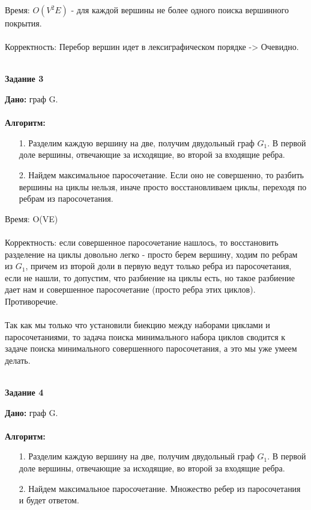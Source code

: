 \documentclass[12pt]{article} %
\begin{document}
	Время: $O(V^2E)$ - для каждой вершины не более одного поиска вершинного покрытия.\\
	\\
	Корректность: Перебор вершин идет в лексиграфическом порядке -> Очевидно.\\
	\\
	\begin{center}
		\textbf{Задание 3}\\
	\end{center}
	\textbf{Дано:} граф G.\\
	\\
	\textbf{Алгоритм:} \\
	\begin{enumerate}
		\item[1.] Разделим каждую вершину на две, получим двудольный граф $G_1$. В первой доле вершины, отвечающие за исходящие, во второй за входящие ребра.
		\item[2.] Найдем максимальное паросочетание. Если оно не совершенно, то разбить вершины на циклы нельзя,
				   иначе просто восстановливаем циклы, переходя по ребрам из паросочетания.
	\end{enumerate}
	Время: O(VE)\\
	\\
	Корректность: если совершенное паросочетание нашлось, то восстановить разделение на циклы довольно легко - просто 
				  берем вершину, ходим по ребрам из $G_1$, причем из второй доли в первую ведут только ребра из паросочетания, если не нашли, то допустим, что разбиение на циклы есть, но такое разбиение дает нам 
				  и совершенное паросочетание (просто ребра этих циклов). Противоречие.\\
	\\
	Так как мы только что установили биекцию между наборами циклами и паросочетаниями, то задача поиска минимального
	набора циклов сводится к задаче поиска минимального совершенного паросочетания, а это мы уже умеем делать.\\
	\\
	\begin{center}
		\textbf{Задание 4}\\
	\end{center}
	\textbf{Дано:} граф G.\\
	\\
	\textbf{Алгоритм:}\\
	\begin{enumerate}
		\item[1.] Разделим каждую вершину на две, получим двудольный граф $G_1$. В первой доле вершины, отвечающие за исходящие, во второй за входящие ребра.
		\item[2.] Найдем максимальное паросочетание. Множество ребер из паросочетания и будет ответом.
	\end{enumerate}
\end{document}
